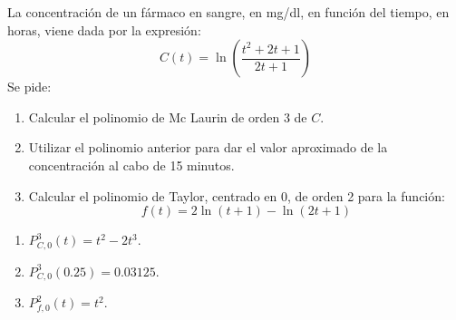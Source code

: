 {La concentración de un fármaco en sangre, en mg/dl, en función del tiempo, en horas, viene dada por la expresión:
\[
C(t) = \ln \left( {\frac{{t^2  + 2t + 1}}{{2t + 1}}} \right)
\]
Se pide:
\begin{enumerate}
\item Calcular el polinomio de Mc Laurin de orden 3 de $C$.
\item Utilizar el polinomio anterior para dar el valor aproximado de la concentración al cabo de 15 minutos.
\item Calcular el polinomio de Taylor, centrado en 0, de orden 2 para la función:
\[
f(t) = 2\ln (t + 1) - \ln (2t + 1)
\]
\end{enumerate}
}
{\begin{enumerate}
\item $P_{C,0}^3(t) = t^2-2t^3$.
\item $P_{C,0}^3(0.25) = 0.03125$.
\item $P_{f,0}^2(t) = t^2$.
\end{enumerate}}
